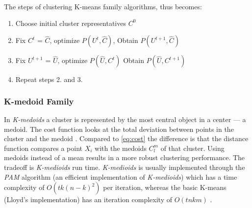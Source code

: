 \documentclass[../report.tex]{subfiles}
\begin{document}
The steps of clustering K-means family algorithms, thus becomes:

\begin{enumerate}
  \item Choose initial cluster representatives $C^0$
  \item Fix $C^t$ = $\hat{C}$, optimize $P(U^{t}, \hat{ C })$, Obtain $P(U^{t + 1}, \hat{ C })$
  \item Fix $U^{t + 1}$ = $\hat{U}$, optimize $P(\hat{U}, C^t)$ Obtain $P(\hat{ U }, C^{t + 1})$
  \item Repeat steps 2. and 3.
\end{enumerate}


\subsubsection{K-medoid Family}
In \textit{K-medoids} a cluster is represented by the most central object in a center --- a medoid. The cost function looks at the total deviation between points in the cluster and the medoid \cite{Ng2002}. Compared to \cref{eq:cost} the difference is that the distance function compares a point $X_i$ with the medoids $C_l^m$ of that cluster. Using medoids instead of a mean results in a more robust clustering performance. The tradeoff is \textit{K-medioids} run time. \textit{K-medioids} is usually implemented through the \textit{PAM} algorithm (an efficient implementation of \textit{K-medioids}) which has a time complexity of $O(tk(n − k)^2)$ per iteration, whereas the basic K-means (Lloyd's implementation) has an iteration complexity of $O(tnkm)$ \cite{Ng2002}.
\end{document}
